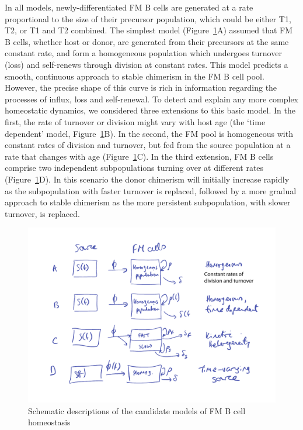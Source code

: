 \documentclass[12pt]{article}
\begin{document}
	
In all models, newly-differentiated FM B cells are generated at a rate proportional to the size of their precursor population, which  could be either T1, T2, or T1 and T2 combined. The simplest model (Figure~\ref{fig:FM-model-sketches}A)  assumed that  FM B cells, whether host or donor, are generated from their precursors at the same constant rate, and form a homogeneous population which undergoes turnover (loss) and self-renews through division at constant rates. This model predicts a smooth, continuous approach to stable chimerism in the FM B cell pool. 
However, the precise shape of this curve is rich in information regarding the processes of influx, loss and self-renewal. To detect and explain any more complex homeostatic dynamics, we considered three extensions to this basic model. In the first, the rate of turnover or division might vary with host age (the `time dependent' model, Figure~\ref{fig:FM-model-sketches}B). In the second, the FM pool is homogeneous with constant rates of division and turnover, but fed from the source population at a rate that changes with age  (Figure~\ref{fig:FM-model-sketches}C).  In the third extension,  FM B cells comprise two independent subpopulations turning over at different rates (Figure~\ref{fig:FM-model-sketches}D). In this scenario the donor chimerism will initially increase rapidly as the subpopulation with faster turnover is replaced, followed by a more gradual approach to stable chimerism as the more persistent subpopulation, with slower turnover, is replaced. 

	\begin{figure}[htbp] %
	   \centering
	   \includegraphics[width=0.8\linewidth]{figures/FM-Model-Sketches.pdf} 
	   \caption{Schematic descriptions of the candidate models of FM B cell homeostasis}
	   \label{fig:FM-model-sketches}
	\end{figure}
\end{document}
